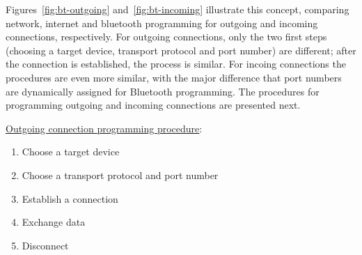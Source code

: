 Figures~\ref{fig:bt-outgoing} and~\ref{fig:bt-incoming} illustrate this concept,
comparing network, internet and bluetooth programming for outgoing and incoming
connections, respectively. For outgoing connections, only the two first steps
(choosing a target device, transport protocol and port number) are different;
after the connection is established, the process is similar. For incoing
connections the procedures are even more similar, with the major difference that
port numbers are dynamically assigned for Bluetooth programming. The procedures
for programming outgoing and incoming connections are presented next.

\uline{Outgoing connection programming procedure}:
\begin{enumerate}
\item Choose a target device
\item Choose a transport protocol and port number
\item Establish a connection
\item Exchange data
\item Disconnect
\end{enumerate}

